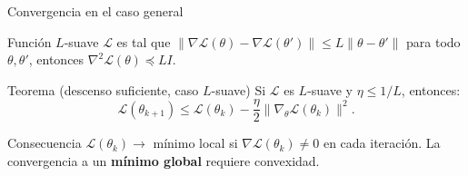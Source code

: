\documentclass[aspectratio=169,12pt]{beamer}
\begin{document}
\begin{frame}{Convergencia en el caso general}
	\begin{defbox}{Función $L$-suave}
		$\mathcal{L}$ es tal que $\|\nabla\mathcal{L}(\theta) - \nabla\mathcal{L}(\theta')\| \leq L\|\theta-\theta'\|$
		para todo $\theta, \theta'$, entonces $\nabla^2\mathcal{L}(\theta) \preceq LI$.
	\end{defbox}
	
	\begin{resultbox}{Teorema (descenso suficiente, caso $L$-suave)}
		Si $\mathcal{L}$ es $L$-suave y $\eta \leq 1/L$, entonces:
		\[
		\mathcal{L}(\theta_{k+1}) \leq \mathcal{L}(\theta_k) - \frac{\eta}{2}\|\nabla_\theta\mathcal{L}(\theta_k)\|^2.
		\]
	\end{resultbox}
	
	
	\begin{obsbox}{Consecuencia}
		$\mathcal{L}(\theta_k) \to$ mínimo local si $\nabla\mathcal{L}(\theta_k) \neq 0$
		en cada iteración. La convergencia a un \textbf{mínimo global} requiere convexidad.
	\end{obsbox}
\end{frame}
\end{document}
